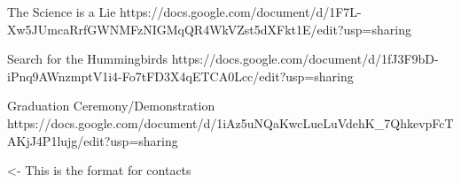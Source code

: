 \documentclass[char]{GL2020}
\begin{document}
The Science is a Lie
https://docs.google.com/document/d/1F7L-Xw5JUmcaRrfGWNMFzNIGMqQR4WkVZst5dXFkt1E/edit?usp=sharing

Search for the Hummingbirds
https://docs.google.com/document/d/1fJ3F9bD-iPnq9AWnzmptV1i4-Fo7tFD3X4qETCA0Lcc/edit?usp=sharing

Graduation Ceremony/Demonstration
https://docs.google.com/document/d/1iAz5uNQaKwcLueLuVdehK_7QhkevpFcTAKjJ4P1lujg/edit?usp=sharing

\begin{itemz}[Goals]
	\item 
\end{itemz}

\begin{itemz}[Notes]
	\item 
\end{itemz}

\begin{contacts}
	\contact{\cTest{}} <- This is the format for contacts 
\end{contacts}
\end{document}
